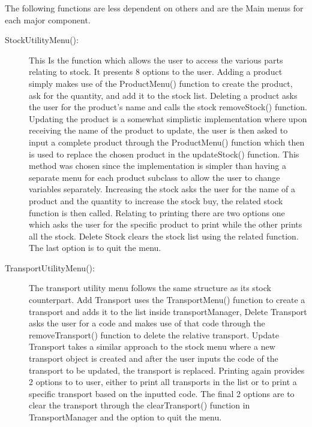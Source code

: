 \documentclass[12pt, a4paper]{report}
\begin{document}
The following functions are less dependent on others and are the Main menus for each major component.
\\

\begin{description}
   \item [StockUtilityMenu():] This Is the function which allows the user to access the various parts relating to stock. It presents 8 options to the user. Adding a product simply makes use of the ProductMenu() function to create the product, ask for the quantity, and add it to the stock list. Deleting a product asks the user for the product's name and calls the stock removeStock() function. Updating the product is a somewhat simplistic implementation where upon receiving the name of the product to update, the user is then asked to input a complete product through the ProductMenu() function which then is used to replace the chosen product in the updateStock() function. This method was chosen since the implementation is simpler than having a separate menu for each product subclass to allow the user to change variables separately. Increasing the stock asks the user for the name of a product and the quantity to increase the stock buy, the related stock function is then called. Relating to printing there are two options one which asks the user for the specific product to print while the other prints all the stock. Delete Stock clears the stock list using the related function. The last option is to quit the menu.
   
   \item [TransportUtilityMenu():] The transport utility menu follows the same structure as its stock counterpart. Add Transport uses the TransportMenu() function to create a transport and adds it to the list inside transportManager, Delete Transport asks the user for a code and makes use of that code through the removeTransport() function to delete the relative transport. Update Transport takes a similar approach to the stock menu where a new transport object is created and after the user inputs the code of the transport to be updated, the transport is replaced. Printing again provides 2 options to to user, either to print all transports in the list or to print a specific transport based on the inputted code. The final 2 options are to clear the transport through the clearTransport() function in TransportManager and the option to quit the menu.
   

\end{description}
\end{document}
